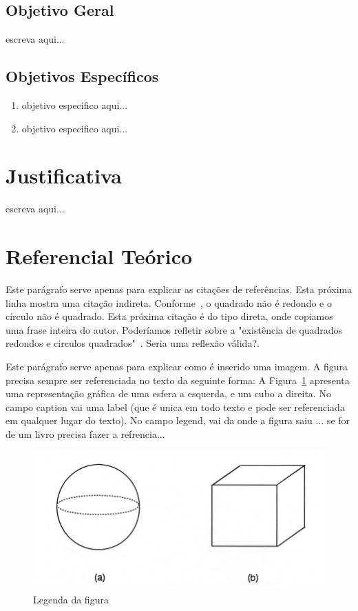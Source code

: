 \subsection{Objetivo Geral}
escreva aqui...

\subsection{Objetivos Específicos}
\begin{enumerate}
	\item objetivo especifico aqui...
	\item objetivo especifico aqui...
\end{enumerate}

\section{Justificativa}
escreva aqui...\\

\section{Referencial Teórico}
Este parágrafo serve apenas para explicar as citações de referências. Esta próxima linha mostra uma citação indireta. Conforme~, o quadrado não é redondo e o círculo não é quadrado. Esta próxima citação é do tipo direta, onde copiamos uma frase inteira do autor. Poderíamos refletir sobre a "existência de quadrados redondos e circulos quadrados"~\cite{ericson2004real}. Seria uma reflexão válida?.

Este parágrafo serve apenas para explicar como é inserido uma imagem. A figura precisa sempre ser referenciada no texto da seguinte forma: A Figura~\ref{fig:figura1} apresenta uma representação gráfica de uma esfera a esquerda, e um cubo a direita. No campo caption vai uma label (que é unica em todo texto e pode ser referenciada em qualquer lugar do texto). No campo legend, vai da onde a figura saiu ... se for de um livro precisa fazer a refrencia...

\begin{figure}[htb]
	\caption{\label{fig:figura1} Legenda da figura}
	\includegraphics[width=\textwidth]{Imagens/figura1.png}
	
\end{figure}



